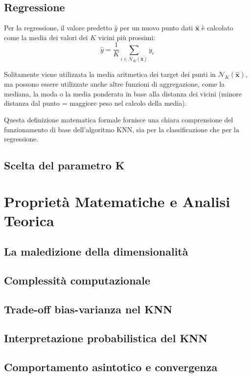 \subsection{Regressione}

Per la regressione, il valore predetto \( \hat{y} \) per un nuovo punto dati \( \hat{\mathbf{x}} \) è calcolato come la media dei valori dei \( K \) vicini più prossimi:
\[
\hat{y} = \frac{1}{K} \sum_{i \in \mathcal{N}_K(\hat{\mathbf{x}})} y_i
\]

Solitamente viene utilizzata la media aritmetica dei target dei punti in $\mathcal{N}_K(\hat{\mathbf{x}})$, ma possono essere utilizzate
anche altre funzioni di aggregazione, come la mediana, la moda o la media ponderata in base alla distanza dei vicini (minore distanza 
dal punto = maggiore peso nel calcolo della media).

Questa definizione matematica formale fornisce una chiara comprensione del funzionamento di base dell'algoritmo KNN, sia per la classificazione che per la regressione.

\subsection{Scelta del parametro K}
\section{Proprietà Matematiche e Analisi Teorica}
\subsection{La maledizione della dimensionalità}
\subsection{Complessità computazionale}
\subsection{Trade-off bias-varianza nel KNN}
\subsection{Interpretazione probabilistica del KNN}
\subsection{Comportamento asintotico e convergenza}